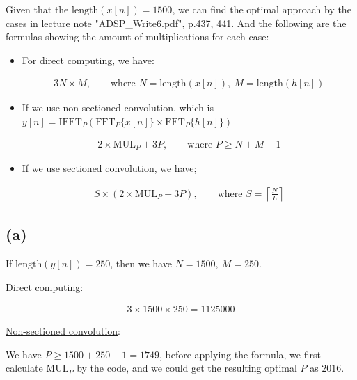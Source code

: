 \documentclass{article}
\begin{document}
Given that the $\mathrm{length}(x[n]) = 1500$, 
we can find the optimal approach by the cases in lecture note "ADSP\_Write6.pdf", p.437, 441.
And the following are the formulas showing the amount of multiplications for each case:
\bigskip
\begin{itemize}
\item For direct computing, we have:

\begin{align*}
    3N \times M, \qquad \text{where } N = \mathrm{length}(x[n]), \ M = \mathrm{length}(h[n])
\end{align*}

\item If we use non-sectioned convolution, which is $y[n] = \mathrm{IFFT}_P( \mathrm{FFT}_P\{x[n]\} \times \mathrm{FFT}_P\{h[n]\} )$

\begin{align*}
    2 \times \mathrm{MUL}_{P} + 3 P, \qquad \text{where } P \geq N + M - 1
\end{align*}

\item If we use sectioned convolution, we have;

\begin{align*}
    S \times (2 \times \mathrm{MUL}_{P} + 3 P), \qquad \text{where } S = \left\lceil \frac{N}{L} \right\rceil
\end{align*}


\end{itemize}


\subsection*{(a)}

If $\mathrm{length}(y[n]) = 250$, then we have $N = 1500, \ M = 250$.
\bigskip

\underline{Direct computing}:

\begin{align*}
    3 \times 1500 \times 250 = 1125000
\end{align*}

\underline{Non-sectioned convolution}:
\bigskip

We have $P \geq 1500 + 250 - 1 = 1749$, before applying the formula, 
we first calculate $\mathrm{MUL}_{P}$ by the code, 
and we could get the resulting optimal $P$ as $2016$.
\end{document}
